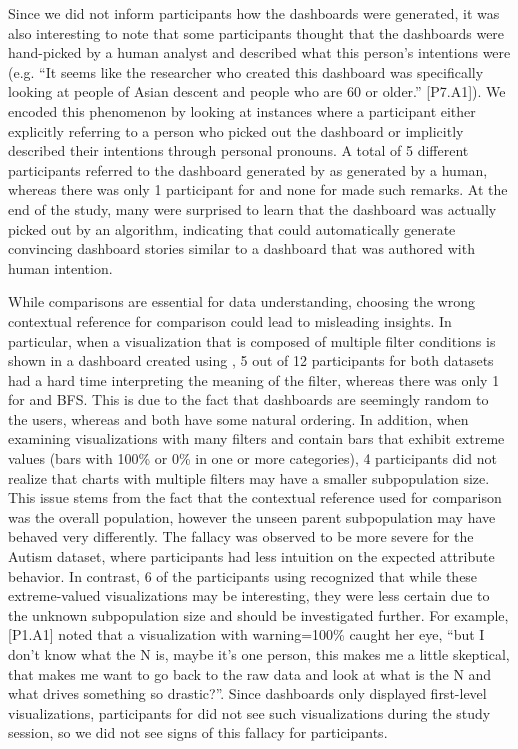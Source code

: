 \par Since we did not inform participants how the dashboards were generated, it was also interesting to note that some participants thought that the dashboards were hand-picked by a human analyst and described what this person's intentions were (e.g. ``It seems like the researcher who created this dashboard was specifically looking at people of Asian descent and people who are 60 or older.'' [P7.A1]). We encoded this phenomenon by looking at instances where a participant either explicitly referring to a person who picked out the dashboard or implicitly described their intentions through personal pronouns. A total of 5 different participants referred to the dashboard generated by \system as generated by a human, whereas there was only 1 participant for \cluster and none for \BFS made such remarks. At the end of the study, many were surprised to learn that the \system dashboard was actually picked out by an algorithm, indicating that \system could automatically generate convincing dashboard stories similar to a dashboard that was authored with human intention.

\par While comparisons are essential for data understanding, choosing the wrong contextual reference for comparison could lead to misleading insights. In particular, when a visualization that is composed of multiple filter conditions is shown in a dashboard created using \cluster, 5 out of 12 participants for both datasets had a hard time interpreting the meaning of the filter, whereas there was only 1 for \system and BFS. This is due to the fact that \cluster dashboards are seemingly random to the users, whereas \BFS and \system both have some natural ordering. In addition, when examining visualizations with many filters and contain bars that exhibit extreme values (bars with 100\% or 0\% in one or more categories), 4 \cluster participants did not realize that charts with multiple filters may have a smaller subpopulation size. This issue stems from the fact that the contextual reference used for comparison was the overall population, however the unseen parent subpopulation may have behaved very differently. The fallacy was observed to be more severe for the Autism dataset, where participants had less intuition on the expected attribute behavior. In contrast, 6 of the participants using \system recognized that while these extreme-valued visualizations may be interesting, they were less certain due to the unknown subpopulation size and should be investigated further. For example, [P1.A1] noted that a visualization with warning=100\% caught her eye, ``but I don't know what the N is, maybe it's one person, this makes me a little skeptical, that makes me want to go back to the raw data and look at what is the N and what drives something so drastic?''. Since \BFS dashboards only displayed first-level visualizations, participants for \BFS did not see such visualizations during the study session, so we did not see signs of this fallacy for \BFS participants.

